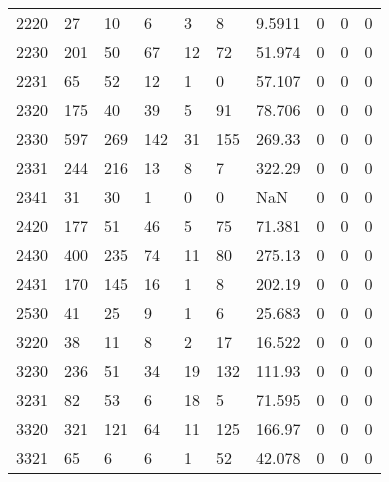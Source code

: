 \begin{longtable}{llllllllll}
2220 & 27            & 10               & 6                  & 3                & 8                  & 9.5911 & 0 & 0 & 0 \\
2230 & 201           & 50               & 67                 & 12               & 72                 & 51.974 & 0 & 0 & 0 \\
2231 & 65            & 52               & 12                 & 1                & 0                  & 57.107 & 0 & 0 & 0 \\
2320 & 175           & 40               & 39                 & 5                & 91                 & 78.706 & 0 & 0 & 0 \\
2330 & 597           & 269              & 142                & 31               & 155                & 269.33 & 0 & 0 & 0 \\
2331 & 244           & 216              & 13                 & 8                & 7                  & 322.29 & 0 & 0 & 0 \\
2341 & 31            & 30               & 1                  & 0                & 0                  & NaN    & 0 & 0 & 0 \\
2420 & 177           & 51               & 46                 & 5                & 75                 & 71.381 & 0 & 0 & 0 \\
2430 & 400           & 235              & 74                 & 11               & 80                 & 275.13 & 0 & 0 & 0 \\
2431 & 170           & 145              & 16                 & 1                & 8                  & 202.19 & 0 & 0 & 0 \\
2530 & 41            & 25               & 9                  & 1                & 6                  & 25.683 & 0 & 0 & 0 \\
3220 & 38            & 11               & 8                  & 2                & 17                 & 16.522 & 0 & 0 & 0 \\
3230 & 236           & 51               & 34                 & 19               & 132                & 111.93 & 0 & 0 & 0 \\
3231 & 82            & 53               & 6                  & 18               & 5                  & 71.595 & 0 & 0 & 0 \\
3320 & 321           & 121              & 64                 & 11               & 125                & 166.97 & 0 & 0 & 0 \\
3321 & 65            & 6                & 6                  & 1                & 52                 & 42.078 & 0 & 0 & 0 \\

\end{longtable}
